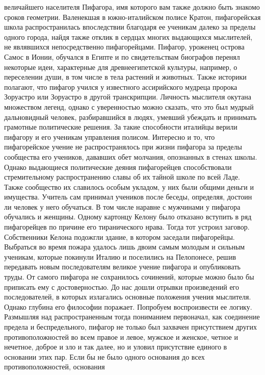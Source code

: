 величайшего населителя Пифагора, имя которого вам также должно быть знакомо
сроков геометрии. Валенекшая в южно-италийском полисе Кратон, пифагорейская
школа распространилась впоследствии благодаря ее ученикам далеко за пределы
одного города, найдя также отклик в сердцах многих выдающихся мыслителей, не
являвшихся непосредственно пифагорейцами. Пифагор, уроженец острова Самос в
Ионии, обучался в Египте и по свидетельствам биографов перенял некоторые идеи,
характерные для древнеегипетской культуры, например, о переселении души, в том
числе в тела растений и животных. Также историки полагают, что пифагор учился у
известного ассирийского мудреца пророка Зоруастро или Зоруастро в другой
транскрипции. Личность мыслителя окутана множеством легенд, однако с
уверенностью можно сказать, что это был мудрый дальновидный человек,
разбиравшийся в людях, умевший убеждать и принимать грамотные политические
решения. За такие способности италийцы верили пифагору и его ученикам управления
полисом. Интересно и то, что пифагорейское учение не распространялось при жизни
пифагора за пределы сообщества его учеников, дававших обет молчания, опознанных
в стенах школы. Однако выдающиеся политические деяния пифагорейцев
способствовали стремительному распространению славы об их тайной школе по всей
Ладе. Также сообщество их славилось особым укладом, у них были общими деньги и
имущества. Учитель сам принимал учеников после беседы, определяя, достоин ли
человек у него обучаться. В том числе наравне с мужчинами у пифагора обучались и
женщины. Одному картонцу Келону было отказано вступить в ряд пифагорейцев по
причине его тиранического нрава. Тогда тот устроил заговор. Собственники Келона
подожгли здание, в котором заседали пифагорейцы. Выбраться во время пожара
удалось лишь двоим самым молодым и сильным ученикам, которые покинули Италию и
поселились на Пелопонесе, решив передавать новым последователям великое учение
пифагора и опубликовать труды. От самого пифагора не сохранилось сочинений,
которые можно было бы приписать ему с достоверностью. До нас дошли отрывки
произведений его последователей, в которых излагались основные положения учения
мыслителя. Однако глубина его философии поражает. Попробуем воспроизвести ее
логику. Размышляя над распространенным тогда пониманием первоначал, как
соединение предела и беспредельного, пифагор не только был захвачен присутствием
других противоположностей во всем правое и левое, мужское и женское, четное и
нечетное, доброе и зло и так далее, но и уловил присутствие единого в основании
этих пар. Если бы не было одного основания до всех противоположностей, основания
